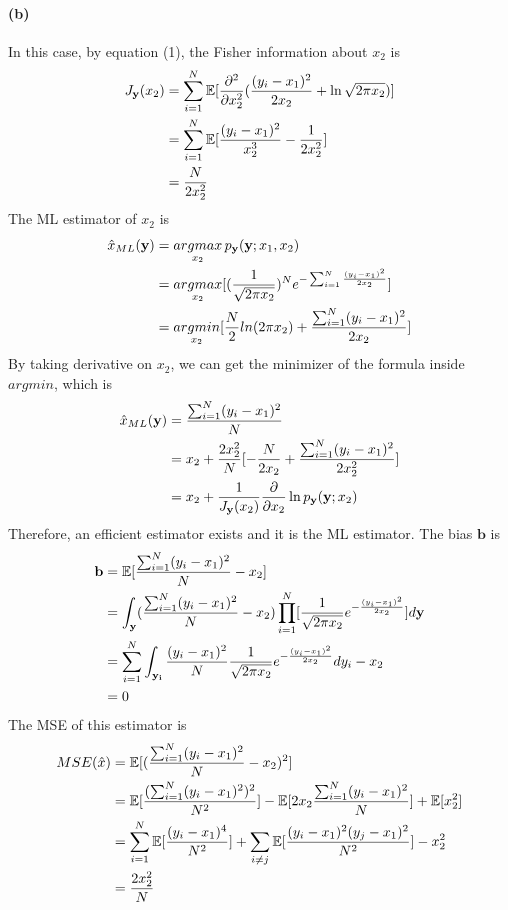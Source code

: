 \documentclass{article}
\begin{document}
\paragraph{(b)}
In this case, by equation (1), the Fisher information about $x_2$ is
\begin{align}
	J_{\mathbf{y}}(x_2)&=\sum_{i=1}^N\mathbb{E}[\frac{\partial^2}{\partial x_2^2}(\frac{(y_i-x_1)^2}{2x_2}+\ln \sqrt{2\pi x_2})]\notag\\
	&=\sum_{i=1}^N\mathbb{E}[\frac{(y_i-x_1)^2}{x_2^3}-\frac{1}{2x_2^2}]\notag\\
	&=\frac{N}{2x_2^2}\notag
\end{align}
The ML estimator of $x_2$ is
\begin{align}
	\hat{x}_{ML}(\mathbf{y})&=\mathop{argmax}_{x_2}p_{\mathbf{y}}(\mathbf{y};x_1,x_2)\notag\\
	&=\mathop{argmax}_{x_2}[(\frac{1}{\sqrt{2\pi x_2}})^Ne^{-\sum_{i=1}^N\frac{(y_i-x_1)^2}{2x_2}}]\notag\\
	&=\mathop{argmin}_{x_2}[\frac{N}{2}ln (2\pi x_2)+\frac{\sum_{i=1}^N(y_i-x_1)^2}{2x_2}]\notag
\end{align}
By taking derivative on $x_2$, we can get the minimizer of the formula inside $argmin$, which is
\begin{align}
	\hat{x}_{ML}(\mathbf{y})&=\frac{\sum_{i=1}^N(y_i-x_1)^2}{N}\notag\\
	&=x_2+\frac{2x_2^2}{N}[-\frac{N}{2x_2}+\frac{\sum_{i=1}^N(y_i-x_1)^2}{2x_2^2}]\notag\\
	&=x_2+\frac{1}{J_{\mathbf{y}}(x_2)}\frac{\partial}{\partial x_2}\ln p_{\mathbf{y}}(\mathbf{y};x_2)\notag
\end{align}
Therefore, an efficient estimator exists and it is the ML estimator. The bias $\mathbf{b}$ is
\begin{align}
	\mathbf{b}&=\mathbb{E}[\frac{\sum_{i=1}^N (y_i-x_1)^2}{N}-x_2]\notag\\
	&=\int_{\mathbf{y}}(\frac{\sum_{i=1}^N (y_i-x_1)^2}{N}-x_2)\prod_{i=1}^N[\frac{1}{\sqrt{2\pi x_2}}e^{-\frac{(y_i-x_1)^2}{2x_2}}]d\mathbf{y}\notag\\
	&=\sum_{i=1}^N\int_{\mathbf{y_i}}\frac{ (y_i-x_1)^2}{N}\frac{1}{\sqrt{2\pi x_2}}e^{-\frac{(y_i-x_1)^2}{2x_2}}dy_i-x_2\notag\\
	&=0\notag
\end{align}
The MSE of this estimator is
\begin{align}
	MSE(\hat{x})&=\mathbb{E}[(\frac{\sum_{i=1}^N (y_i-x_1)^2}{N}-x_2)^2]\notag\\
	&=\mathbb{E}[\frac{(\sum_{i=1}^N (y_i-x_1)^2)^2}{N^2}]-\mathbb{E}[2x_2\frac{\sum_{i=1}^N (y_i-x_1)^2}{N}]+\mathbb{E}[x_2^2]\notag\\
	&=\sum_{i=1}^N\mathbb{E}[\frac{(y_i-x_1)^4}{N^2}]+\sum_{i\neq j}\mathbb{E}[\frac{(y_i-x_1)^2(y_j-x_1)^2}{N^2}]-x_2^2\notag\\
	&=\frac{2x_2^2}{N}\notag
\end{align}
\end{document}
